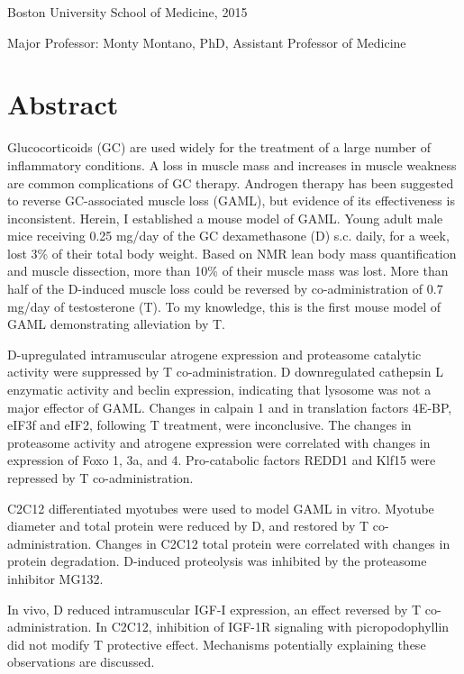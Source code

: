 \documentclass[12pt,english]{report}\usepackage[]{graphicx}\usepackage[]{color}
\begin{document}
\begin{center}
Boston University School of Medicine, 2015
\par\end{center}

Major Professor: Monty Montano, PhD, Assistant Professor of Medicine


\section{Abstract}

Glucocorticoids (GC) are used widely for the treatment of a large
number of inflammatory conditions. A loss in muscle mass and increases
in muscle weakness are common complications of GC therapy. Androgen
therapy has been suggested to reverse GC-associated muscle loss (GAML),
but evidence of its effectiveness is inconsistent. Herein, I established
a mouse model of GAML. Young adult male mice receiving 0.25 mg/day
of the GC dexamethasone (D) s.c. daily, for a week, lost 3\% of their
total body weight. Based on NMR lean body mass quantification and
muscle dissection, more than 10\% of their muscle mass was lost. More
than half of the D-induced muscle loss could be reversed by co-administration
of 0.7 mg/day of testosterone (T). To my knowledge, this is the first
mouse model of GAML demonstrating alleviation by T.

D-upregulated intramuscular atrogene expression and proteasome catalytic
activity were suppressed by T co-administration. D downregulated cathepsin
L enzymatic activity and beclin expression, indicating that lysosome
was not a major effector of GAML. Changes in calpain 1 and in translation
factors 4E-BP, eIF3f and eIF2, following T treatment, were inconclusive.
The changes in proteasome activity and atrogene expression were correlated
with changes in expression of Foxo 1, 3a, and 4. Pro-catabolic factors
REDD1 and Klf15 were repressed by T co-administration.

C2C12 differentiated myotubes were used to model GAML in vitro. Myotube
diameter and total protein were reduced by D, and restored by T co-administration.
Changes in C2C12 total protein were correlated with changes in protein
degradation. D-induced proteolysis was inhibited by the proteasome
inhibitor MG132.

In vivo, D reduced intramuscular IGF-I expression, an effect reversed
by T co-administration. In C2C12, inhibition of IGF-1R signaling with
picropodophyllin did not modify T protective effect. Mechanisms potentially
explaining these observations are discussed.
\end{document}
